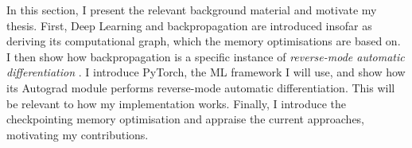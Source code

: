 In this section, I present the relevant background material and motivate my thesis. First, Deep Learning and backpropagation are introduced insofar as deriving its computational graph, which the memory optimisations are based on. I then show how backpropagation is a specific instance of \textit{reverse-mode automatic differentiation} \cite{Baydin2015}. I introduce PyTorch, the ML framework I will use, and show how its Autograd module performs reverse-mode automatic differentiation. This will be relevant to how my implementation works. Finally, I introduce the checkpointing memory optimisation and appraise the current approaches, motivating my contributions.

